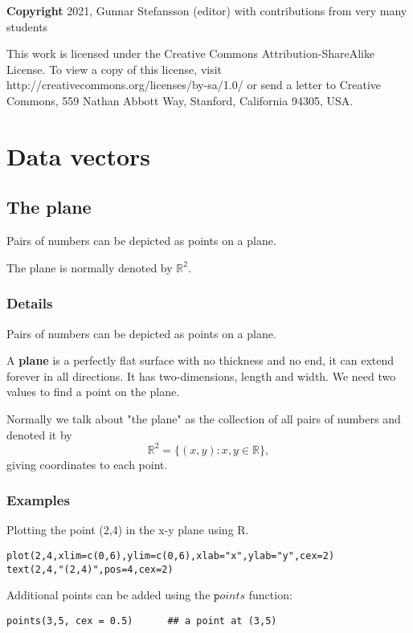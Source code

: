 \documentclass[12pt,a4paper]{article}
\theoremstyle{regla}
\theoremstyle{remark}
\theoremstyle{definition}
\theoremstyle{nonumberbreak}
\begin{document}
{\bf Copyright}
2021, Gunnar Stefansson (editor) with contributions from very many students

This work is licensed under the Creative Commons
Attribution-ShareAlike License. To view a copy of this license, visit
http://creativecommons.org/licenses/by-sa/1.0/ or send a letter to
Creative Commons, 559 Nathan Abbott Way, Stanford, California 94305,
USA.
\clearpage
\section{Data vectors}
\subsection{The plane}
\begin{fbox}
\begin{minipage}{0.97\textwidth}
Pairs of numbers can be depicted as points on a plane.

The plane is normally denoted by $\mathbb{R}^2$.
\end{minipage}
\end{fbox}
\subsubsection{Details}
Pairs of numbers can be depicted as points on a plane.

\begin{defn}
A {\bf plane} is a perfectly flat surface with no thickness and no end, it can extend forever in all directions. It has two-dimensions, length and width. We need two values to find a point on the plane. 
\end{defn}

Normally we talk about "the plane" as the collection of all pairs of numbers and denoted it by 
$$
\mathbb{R}^2 = \{ (x,y) : x,y \in \mathbb{R} \},
$$ 
giving coordinates to each point.


\subsubsection{Examples}
\begin{xmpl}
Plotting the point (2,4) in the x-y plane using R.
\begin{lstlisting}
plot(2,4,xlim=c(0,6),ylim=c(0,6),xlab="x",ylab="y",cex=2)
text(2,4,"(2,4)",pos=4,cex=2)
\end{lstlisting}

Additional points can be added using the $\texttt points$ function:

\begin{lstlisting}
points(3,5, cex = 0.5)      ## a point at (3,5)
\end{lstlisting}

\end{xmpl}
\end{document}
